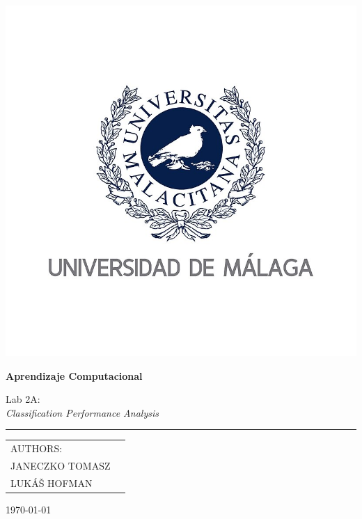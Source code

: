 \documentclass[runningheads]{llncs}
\begin{document}
\begin{titlepage}
\scshape
\centering
\includegraphics[scale=0.57]{logo.png} \par \vspace{0.1cm}
\huge 

{\huge{\textbf{Aprendizaje Computacional}}}\par \vspace{0.4cm}
Lab 2A: \\ \textit{Classification Performance Analysis}
\rule{\textwidth}{2px}

\begin{tabularx}{\textwidth}{X r}
AUTHORS:\\
\large{JANECZKO TOMASZ}   & \\
\large{LUKÁŠ HOFMAN}   &  \\
\end{tabularx}
\vfill
\today

\end{titlepage}

\newpage

\end{document}

